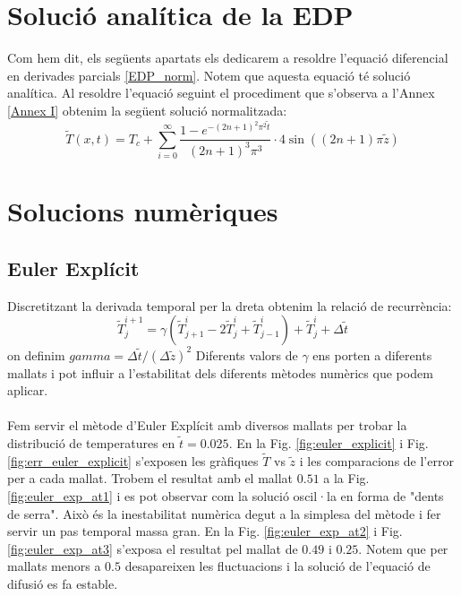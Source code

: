 \documentclass{article}
\begin{document}
\section{Solució analítica de la EDP}
Com hem dit, els següents apartats els dedicarem a resoldre l'equació diferencial en derivades parcials \eqref{EDP_norm}. Notem que aquesta equació té solució analítica. Al resoldre l'equació seguint el procediment que s'observa a l'Annex \ref{Annex I} obtenim la següent solució normalitzada:
\begin{equation*}
    \tilde{T}(x,t) = T_c + \sum_{i=0}^{\infty} \frac{ 1-e^{-(2n+1)^2 \pi^2 \tilde{t}}}{(2n+1)^3\pi^3}\cdot 4\sin((2n+1)\pi \tilde{z})
\end{equation*}

\section{Solucions numèriques}
\subsection{Euler Explícit}
Discretitzant la derivada temporal per la dreta obtenim la relació de recurrència:
\begin{equation*}
    \tilde{T}_{j}^{i+1} = \gamma (\tilde{T}_{j+1}^{i}-2\tilde{T}_{j}^{i}+\tilde{T}_{j-1}^{i}) + \tilde{T}_{j}^{i} + \Delta \tilde{t}
\end{equation*}
on definim $gamma = \Delta \tilde{t}/(\Delta \tilde{z})^2$ Diferents valors de $\gamma$ ens porten a diferents mallats i pot influir a l'estabilitat dels diferents mètodes numèrics que podem aplicar.\\\\
Fem servir el mètode d'Euler Explícit \cite{Navau2024} amb diversos mallats per trobar la distribució de temperatures en $\tilde{t}=0.025$. En la Fig. \ref{fig:euler_explicit} i Fig. \ref{fig:err_euler_explicit} s'exposen les gràfiques $\tilde{T}$ vs $\tilde{z}$ i les comparacions de l'error per a cada mallat. Trobem el resultat amb el mallat $0.51$ a la Fig. \ref{fig:euler_exp_at1} i es pot observar com la solució oscil·la en forma de "dents de serra". Això és la inestabilitat numèrica degut a la simplesa del mètode i fer servir un pas temporal massa gran.  En la Fig. \ref{fig:euler_exp_at2} i Fig. \ref{fig:euler_exp_at3} s'exposa el resultat pel mallat de $0.49$ i $0.25$. Notem que per mallats menors a $0.5$ desapareixen les fluctuacions i la solució de l'equació de difusió es fa estable.
\end{document}
